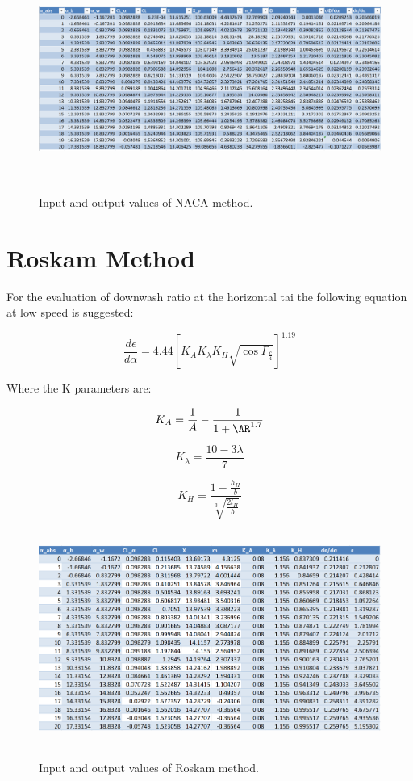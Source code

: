 \begin{figure}[H]
\centering
{\includegraphics[height=6.6cm]{immagini/giord1.png}} 
\caption{Input and output values of NACA method.}
\label{giordanodata2}
\end{figure} 


\section{Roskam Method}
For the evaluation of downwash ratio at the horizontal tai the following equation at low speed is suggested:

\begin{equation} 
\frac{d\epsilon}{d\alpha} = 4.44 {\left[ K_A K_{\lambda} K_H \sqrt{\cos{ \Gamma_{\frac{c}{4}}}}  \right]}^{1.19}
\end{equation}

Where the K parameters are:

\begin{equation}
K_A = \frac{1}{A} - \frac{1}{1+\AR^{1.7}}
\end{equation}

\begin{equation}
K_{\lambda} = \frac{10 - 3 \lambda}{7}
\end{equation}

\begin{equation}
K_H = \frac{1- \frac{h_H}{b}}{\sqrt[3]{\frac{2 l_H}{b}}}
\end{equation}
\begin{figure}[H]
\centering
{\includegraphics[height=7cm]{immagini/roskam1}} 
\caption{Input and output values of Roskam method.}
\label{roskamdata}
\end{figure} 

